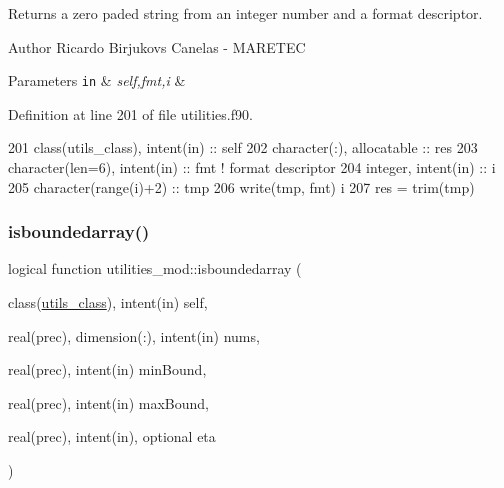 Returns a zero paded string from an integer number and a format descriptor. 

\begin{DoxyAuthor}{Author}
Ricardo Birjukovs Canelas -\/ M\+A\+R\+E\+T\+EC 
\end{DoxyAuthor}

\begin{DoxyParams}[1]{Parameters}
\mbox{\tt in}  & {\em self,fmt,i} & \\
\hline
\end{DoxyParams}


Definition at line 201 of file utilities.\+f90.


\begin{DoxyCode}
201     \textcolor{keywordtype}{class}(utils\_class), \textcolor{keywordtype}{intent(in)} :: self
202     \textcolor{keywordtype}{character(:)}, \textcolor{keywordtype}{allocatable} :: res
203     \textcolor{keywordtype}{character(len=6)}, \textcolor{keywordtype}{intent(in)} :: fmt \textcolor{comment}{! format descriptor}
204     \textcolor{keywordtype}{integer}, \textcolor{keywordtype}{intent(in)} :: i
205     \textcolor{keywordtype}{character(range(i)+2)} :: tmp
206     \textcolor{keyword}{write}(tmp, fmt) i
207     res = trim(tmp)
\end{DoxyCode}
\mbox{\label{namespaceutilities__mod_a1d16eada2f4cb344ad1500b3edba43fa}} 
\subsubsection{\texorpdfstring{isboundedarray()}{isboundedarray()}}
{\footnotesize\ttfamily logical function utilities\+\_\+mod\+::isboundedarray (\begin{DoxyParamCaption}\item[{class(\mbox{\hyperlink{structutilities__mod_1_1utils__class}{utils\+\_\+class}}), intent(in)}]{self,  }\item[{real(prec), dimension(\+:), intent(in)}]{nums,  }\item[{real(prec), intent(in)}]{min\+Bound,  }\item[{real(prec), intent(in)}]{max\+Bound,  }\item[{real(prec), intent(in), optional}]{eta }\end{DoxyParamCaption})\hspace{0.3cm}{\ttfamily [private]}}



